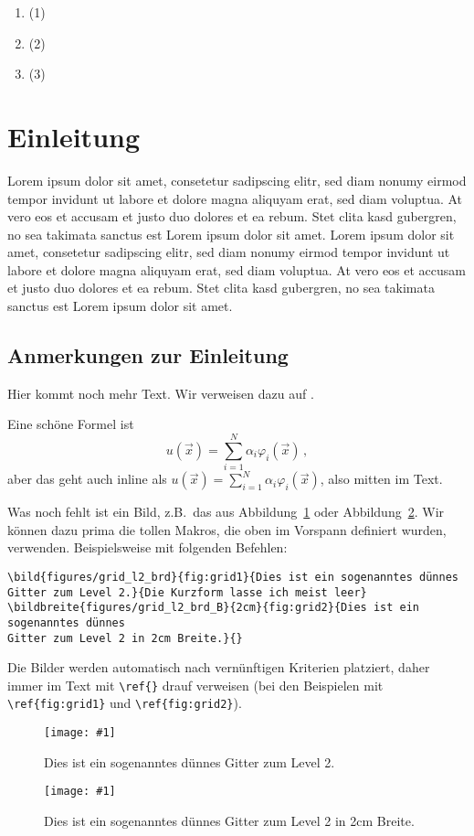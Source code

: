 \documentclass[a4paper,12pt]{llncs}
\numberwithin{equation}{section}
\newcommand{\bild}[4]{
  \begin{figure}[htbp]
    \begin{center}
      \texttt{[image: \#1]}
      \caption[#4]{#3}
      \label{#2}
    \end{center}
  \end{figure}
}
\newcommand{\bildbreite}[5]{
  \begin{figure}[htbp]
    \begin{center}
      \texttt{[image: \#1]}
      \caption[#5]{#4}
      \label{#3}
    \end{center}
  \end{figure}
}
\begin{document}
\begin{enumerate}
\item \cite{Rauber.2012} (1)
\item \cite{Lindholm.2008} (2)
\item \cite{Burgess.2020} (3)
\end{enumerate}



\section{Einleitung}
Lorem ipsum dolor sit amet, consetetur sadipscing elitr, sed diam nonumy eirmod tempor invidunt ut labore et dolore magna aliquyam erat, sed diam voluptua. At vero eos et accusam et justo duo dolores et ea rebum. Stet clita kasd gubergren, no sea takimata sanctus est Lorem ipsum dolor sit amet. Lorem ipsum dolor sit amet, consetetur sadipscing elitr, sed diam nonumy eirmod tempor invidunt ut labore et dolore magna aliquyam erat, sed diam voluptua. At vero eos et accusam et justo duo dolores et ea rebum. Stet clita kasd gubergren, no sea takimata sanctus est Lorem ipsum dolor sit amet.

\subsection{Anmerkungen zur Einleitung}
Hier kommt noch mehr Text. Wir verweisen dazu auf
\cite{thisdocument}.

Eine schöne Formel ist
\[
u(\vec{x}) = \sum_{i=1}^N \alpha_i \varphi_i(\vec{x}) \,,
\]
aber das geht auch inline als $u(\vec{x}) = \sum_{i=1}^N \alpha_i
\varphi_i(\vec{x})$, also mitten im Text.

Was noch fehlt ist ein Bild, z.B.\ das aus
Abbildung~\ref{fig:grid1} oder Abbildung~\ref{fig:grid2}. Wir können dazu prima die tollen Makros,
die oben im Vorspann definiert wurden, verwenden. Beispielsweise mit
folgenden Befehlen:
\begin{verbatim}
\bild{figures/grid_l2_brd}{fig:grid1}{Dies ist ein sogenanntes dünnes
Gitter zum Level 2.}{Die Kurzform lasse ich meist leer}
\bildbreite{figures/grid_l2_brd_B}{2cm}{fig:grid2}{Dies ist ein sogenanntes dünnes
Gitter zum Level 2 in 2cm Breite.}{}
\end{verbatim}
Die Bilder werden automatisch nach vernünftigen Kriterien platziert,
daher immer im Text mit \verb!\ref{}! drauf verweisen (bei den
Beispielen mit \verb!\ref{fig:grid1}! und \verb!\ref{fig:grid2}!).
\bild{figures/grid_l2_brd}{fig:grid1}{Dies ist ein sogenanntes dünnes
  Gitter zum Level 2.}{Die Kurzform lasse ich meist leer}
\bildbreite{figures/grid_l2_brd}{2cm}{fig:grid2}{Dies ist ein sogenanntes dünnes
Gitter zum Level 2 in 2cm Breite.}{}
\end{document}
